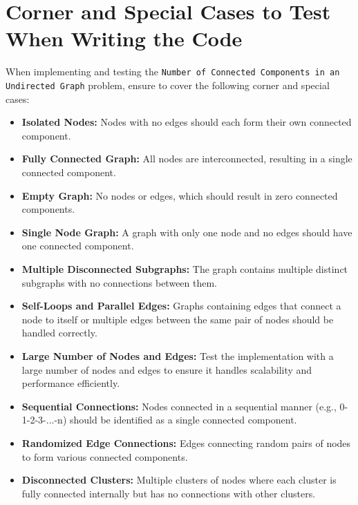 \section*{Corner and Special Cases to Test When Writing the Code}

When implementing and testing the \texttt{Number of Connected Components in an Undirected Graph} problem, ensure to cover the following corner and special cases:

\begin{itemize}
    \item \textbf{Isolated Nodes:}  
    Nodes with no edges should each form their own connected component.
    
    \item \textbf{Fully Connected Graph:}  
    All nodes are interconnected, resulting in a single connected component.
    
    \item \textbf{Empty Graph:}  
    No nodes or edges, which should result in zero connected components.
    
    \item \textbf{Single Node Graph:}  
    A graph with only one node and no edges should have one connected component.
    
    \item \textbf{Multiple Disconnected Subgraphs:}  
    The graph contains multiple distinct subgraphs with no connections between them.
    
    \item \textbf{Self-Loops and Parallel Edges:}  
    Graphs containing edges that connect a node to itself or multiple edges between the same pair of nodes should be handled correctly.
    
    \item \textbf{Large Number of Nodes and Edges:}  
    Test the implementation with a large number of nodes and edges to ensure it handles scalability and performance efficiently.
    
    \item \textbf{Sequential Connections:} 
    Nodes connected in a sequential manner (e.g., 0-1-2-3-...-n) should be identified as a single connected component.
    
    \item \textbf{Randomized Edge Connections:}  
    Edges connecting random pairs of nodes to form various connected components.
    
    \item \textbf{Disconnected Clusters:} 
    Multiple clusters of nodes where each cluster is fully connected internally but has no connections with other clusters.
\end{itemize}

